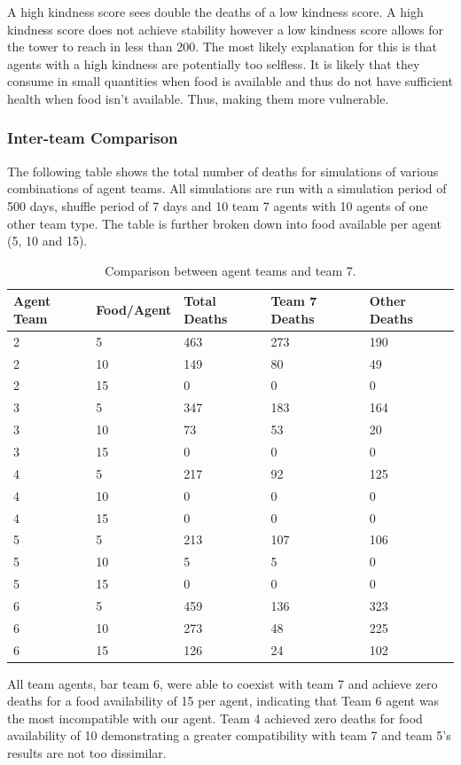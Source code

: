 A high kindness score sees double the deaths of a low kindness score. A high kindness score does not achieve stability however a low kindness score allows for the tower to reach in less than 200. The most likely explanation for this is that agents with a high kindness are potentially too selfless. It is likely that they consume in small quantities when food is available and thus do not have sufficient health when food isn't available. Thus, making them more vulnerable.

\newpage
\subsubsection{Inter-team Comparison}
The following table shows the total number of deaths for simulations of various combinations of agent teams. All simulations are run with a simulation period of 500 days, shuffle period of 7 days and 10 team 7 agents with 10 agents of one other team type. The table is further broken down into food available per agent (5, 10 and 15).
\begin{table}
\begin{center}
\begin{tabular} { | m{4em} | m{6em} | m{4em} | m{4em} | m{4em} | }
    \hline
        \textbf{Agent Team} & \textbf{Food/Agent} & \textbf{Total Deaths} & \textbf{Team 7 Deaths} & \textbf{Other Deaths} \\
    \hline
    2 & 5 & 463 & 273 & 190 \\
  \hline
    2 & 10 & 149 & 80 & 49 \\
  \hline
    2 & 15 & 0 & 0 & 0 \\
  \hline
    3 & 5 & 347 & 183 & 164\\
  \hline
    3 & 10 & 73 & 53 & 20\\
  \hline
    3 & 15 & 0 & 0 & 0 \\
  \hline
    4 & 5 & 217 & 92 & 125\\
  \hline
    4 & 10 & 0 & 0 & 0 \\
  \hline
    4 & 15 & 0 & 0 & 0 \\
  \hline
    5 & 5 & 213 & 107 & 106 \\
  \hline
    5 & 10 & 5 & 5 & 0 \\
  \hline
    5 & 15 &  0 & 0 & 0 \\ 
  \hline
    6 & 5 & 459 & 136 & 323\\
  \hline
    6 & 10 & 273 & 48 & 225\\
  \hline
    6 & 15 & 126 & 24 & 102\\
  \hline
\end{tabular}
\end{center}
\caption{Comparison between agent teams and team 7.}
\end{table}
All team agents, bar team 6, were able to coexist with team 7 and achieve zero deaths for a food availability of 15 per agent, indicating that Team 6 agent was the most incompatible with our agent. Team 4 achieved zero deaths for food availability of 10 demonstrating a greater compatibility with team 7 and team 5's results are not too dissimilar.  

